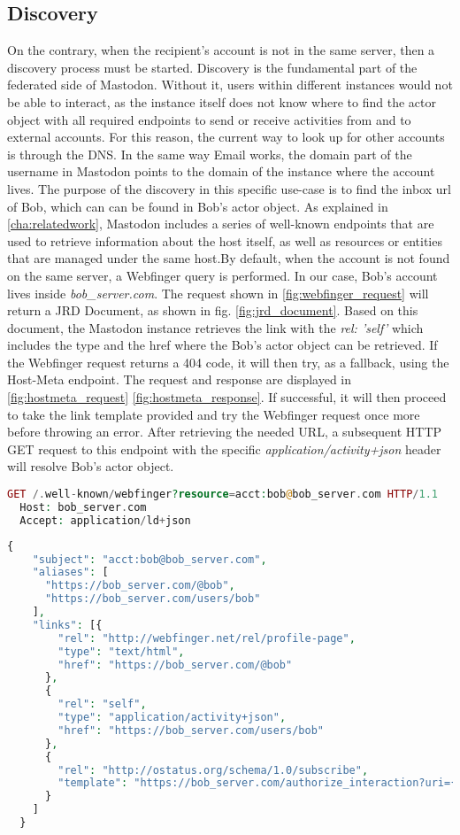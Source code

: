 \subsection{Discovery}
On the contrary, when the recipient's account is not in the same server, then a discovery process must be started. Discovery is the fundamental part of the federated side of Mastodon. Without it, users within different instances would not be able to interact, as the instance itself does not know where to find the actor object with all required endpoints to send or receive activities from and to external accounts. For this reason, the current way to look up for other accounts is through the DNS. In the same way Email works, the domain part of the username in Mastodon points to the domain of the instance where the account lives. The purpose of the discovery in this specific use-case is to find the inbox url of Bob, which can can be found in Bob's actor object. As explained in \autoref{cha:relatedwork}, Mastodon includes a series of well-known endpoints that are used to retrieve information about the host itself, as well as resources or entities that are managed under the same host.By default, when the account is not found on the same server, a Webfinger query is performed. 
In our case, Bob's account lives inside \emph{bob\_server.com}. The request shown in \ref{fig:webfinger_request} will return a JRD Document, as shown in fig. \ref{fig:jrd_document}. Based on this document, the Mastodon instance retrieves the link with the \emph{rel: 'self'} which includes the type and the href where the Bob's actor object can be retrieved. If the Webfinger request returns a 404 code, it will then try, as a fallback, using the Host-Meta endpoint. The request and response are displayed in \ref{fig:hostmeta_request} \ref{fig:hostmeta_response}. If successful, it will then proceed to take the link template provided and try the Webfinger request once more before throwing an error. After retrieving the needed URL, a subsequent HTTP GET request to this endpoint with the specific \emph{application/activity+json} header will resolve Bob's actor object. 

\begin{lstlisting}[language=PHP, caption=Webfinger request, label=fig:webfinger_request]
  GET /.well-known/webfinger?resource=acct:bob@bob_server.com HTTP/1.1
  Host: bob_server.com
  Accept: application/ld+json
\end{lstlisting}

\lstset{style=JSONStyle}
\begin{lstlisting}[language=PHP, caption=JRD Document, label=fig:jrd_document, float=h]
  {
    "subject": "acct:bob@bob_server.com",
    "aliases": [
      "https://bob_server.com/@bob",
      "https://bob_server.com/users/bob"
    ],
    "links": [{
        "rel": "http://webfinger.net/rel/profile-page",
        "type": "text/html",
        "href": "https://bob_server.com/@bob"
      },
      {
        "rel": "self",
        "type": "application/activity+json",
        "href": "https://bob_server.com/users/bob"
      },
      {
        "rel": "http://ostatus.org/schema/1.0/subscribe",
        "template": "https://bob_server.com/authorize_interaction?uri={uri}"
      }
    ]
  }
\end{lstlisting}

